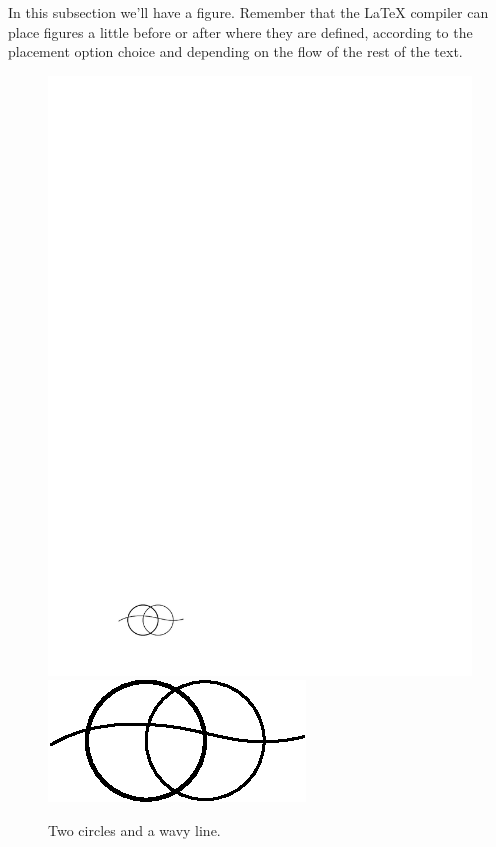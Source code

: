 In this subsection we'll have a figure. Remember that the {\LaTeX} compiler can place figures a little before or after where they are defined, according to the placement option choice and depending on the flow of the rest of the text.

\begin{figure}[htb]
  \centering
  \ifpdf
    \includegraphics{graphics/mygraphic1.pdf}
  \else
    \includegraphics{graphics/mygraphic1-for-ps.eps}
  \fi
  \caption{Two circles and a wavy line.}
\end{figure}

